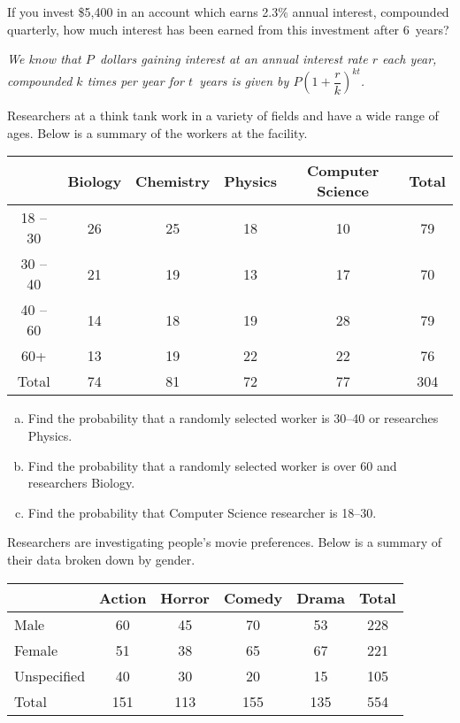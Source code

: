 \documentclass[12pt,letterpaper]{exam}
\begin{document}
\begin{questions}
\newpage
\question[10] If you invest \$5,400 in an account which earns 2.3\% annual interest, compounded quarterly, how much interest has been earned from this investment after 6~years? \pspace

{\itshape
\sol We know that $P$~dollars gaining interest at an annual interest rate $r$ each year, compounded $k$ times per year for $t$~years is given by $P \left(1 + \dfrac{r}{k} \right)^{kt}$.
}



\newpage
\question[10] Researchers at a think tank work in a variety of fields and have a wide range of ages. Below is a summary of the workers at the facility. \par
	\begin{table}[!ht]
	\centering
	\begin{tabular}{|c||c|c|c|c||c|} \hline
	& Biology & Chemistry & Physics & Computer Science & Total \\ \hline
	18 -- 30 & 26 & 25 & 18 & 10 & 79 \\ \hline
	30 -- 40 & 21 & 19 & 13 & 17 & 70 \\ \hline 
	40 -- 60 & 14 & 18 & 19 & 28 & 79 \\ \hline
	60+ & 13 & 19 & 22 & 22 & 76 \\ \hline \hline
	Total & 74 & 81 & 72 & 77 & 304 \\ \hline
	\end{tabular}
	\end{table} \par

\begin{enumerate}[(a)]
\item Find the probability that a randomly selected worker is 30--40 or researches Physics.
\item Find the probability that a randomly selected worker is over 60 and researchers Biology.
\item Find the probability that Computer Science researcher is 18--30. 
\end{enumerate}



\newpage
\question[10] Researchers are investigating people's movie preferences. Below is a summary of their data broken down by gender. \par
	\begin{table}[!ht]
	\centering
	\begin{tabular}{|l||c|c|c|c||c|} \hline
	& Action & Horror & Comedy & Drama & Total \\ \hline
	Male & 60 & 45 & 70 & 53 & 228 \\ \hline
	Female & 51 & 38 & 65 & 67 & 221 \\ \hline 
	Unspecified & 40 & 30 & 20 & 15 & 105 \\ \hline \hline
	Total & 151 & 113 & 155 & 135 & 554 \\ \hline
	\end{tabular}
	\end{table} \par


\end{questions}
\end{document}
